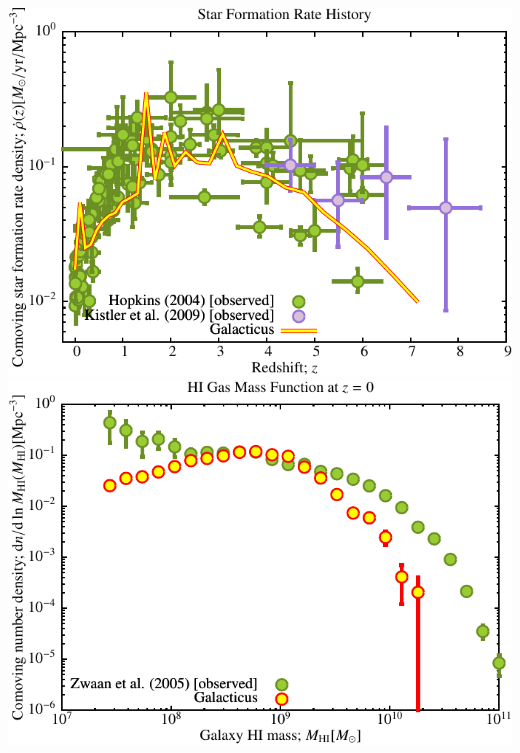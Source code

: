 \includegraphics[scale=0.6]{drd5_r256/Plot_Star_Formation_History.pdf} \\
\includegraphics[scale=0.6]{drd5_r256/Plot_HI_Mass_Function.pdf}

